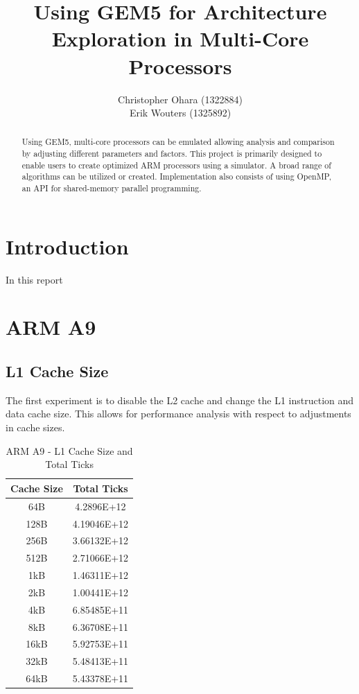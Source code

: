 \documentclass[a4paper, 10pt, conference]{ieeeconf}      %
\title{\LARGE \bf Using GEM5 for Architecture Exploration in Multi-Core Processors}
\author{Christopher Ohara (1322884) \\
Erik Wouters (1325892)
}
\begin{document}
\maketitle
\thispagestyle{empty}
\pagestyle{empty}

\begin{abstract}

Using GEM5, multi-core processors can be emulated allowing analysis and comparison by adjusting different parameters and factors. This project is primarily designed to enable users to create optimized ARM processors using a simulator. A broad range of algorithms can be utilized or created. Implementation also consists of using OpenMP, an API for shared-memory parallel programming.

\end{abstract}

\section{Introduction}
In this report

\section{ARM A9}

\subsection{L1 Cache Size}

The first experiment is to disable the L2 cache and change the L1 instruction and data cache size. This allows for performance analysis with respect to adjustments in cache sizes. 

\begin{table}[h]
\caption{ARM A9 - L1 Cache Size and Total Ticks}
\label{table_example}
\begin{center}
\begin{tabular}{|c||c|}
\hline
Cache Size & Total Ticks\\
\hline
64B & 4.2896E+12\\
\hline
128B & 4.19046E+12\\
\hline
256B & 3.66132E+12\\
\hline
512B & 2.71066E+12\\
\hline
1kB & 1.46311E+12\\
\hline
2kB & 1.00441E+12\\
\hline
4kB & 6.85485E+11\\
\hline
8kB & 6.36708E+11\\
\hline
16kB & 5.92753E+11\\
\hline
32kB & 5.48413E+11\\
\hline
64kB & 5.43378E+11\\
\hline

\end{tabular}
\end{center}
\end{table}
\end{document}
